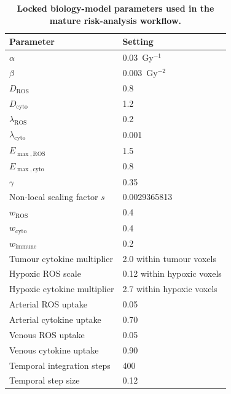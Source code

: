 \begin{table}[H]
\centering
\caption{\textbf{Locked biology-model parameters used in the mature risk-analysis workflow.}}
\label{tab:bio_parameters}
\small
\begin{tabular}{p{5.2cm}p{7.5cm}}
\toprule
Parameter & Setting \\
\midrule
$\alpha$ & 0.03~Gy$^{-1}$ \\
$\beta$ & 0.003~Gy$^{-2}$ \\
$D_{\mathrm{ROS}}$ & 0.8 \\
$D_{\mathrm{cyto}}$ & 1.2 \\
$\lambda_{\mathrm{ROS}}$ & 0.2 \\
$\lambda_{\mathrm{cyto}}$ & 0.001 \\
$E_{\max,\mathrm{ROS}}$ & 1.5 \\
$E_{\max,\mathrm{cyto}}$ & 0.8 \\
$\gamma$ & 0.35 \\
Non-local scaling factor $s$ & 0.0029365813 \\
$w_{\mathrm{ROS}}$ & 0.4 \\
$w_{\mathrm{cyto}}$ & 0.4 \\
$w_{\mathrm{immune}}$ & 0.2 \\
Tumour cytokine multiplier & 2.0 within tumour voxels \\
Hypoxic ROS scale & 0.12 within hypoxic voxels \\
Hypoxic cytokine multiplier & 2.7 within hypoxic voxels \\
Arterial ROS uptake & 0.05 \\
Arterial cytokine uptake & 0.70 \\
Venous ROS uptake & 0.05 \\
Venous cytokine uptake & 0.90 \\
Temporal integration steps & 400 \\
Temporal step size & 0.12 \\
\bottomrule
\end{tabular}
\end{table}

